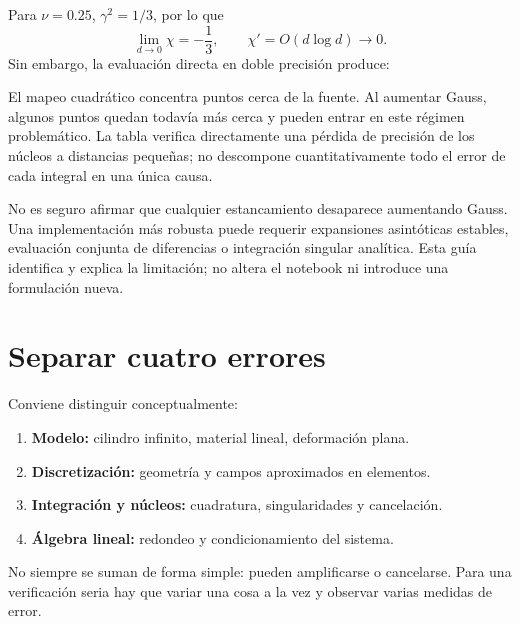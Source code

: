 \documentclass[11pt,a4paper]{report}
\numberwithin{equation}{chapter}
\begin{document}
Para $\nu=0.25$, $\gamma^2=1/3$, por lo que
\begin{equation}
 \lim_{d\to0}\chi=-\frac13,\qquad
 \chi'=O(d\log d)\longrightarrow0.
\end{equation}
Sin embargo, la evaluaci\'on directa en doble precisi\'on produce:

\begin{table}[htbp]
\centering

\caption{Diagn\'ostico de peque\~na distancia a 30 rad/s con el material
del notebook. Los valores extremos de $\chi'$ y la p\'erdida de
$\chi\to-1/3$ evidencian cancelaci\'on y redondeo.}
\label{tab:cancelacion}
\end{table}

El mapeo cuadr\'atico concentra puntos cerca de la fuente.
Al aumentar Gauss, algunos puntos quedan todav\'ia m\'as cerca y
pueden entrar en este r\'egimen problem\'atico.
La tabla verifica directamente una p\'erdida de precisi\'on de los
n\'ucleos a distancias peque\~nas; no descompone cuantitativamente
todo el error de cada integral en una \'unica causa.

\begin{cuidado}
No es seguro afirmar que cualquier estancamiento desaparece aumentando
Gauss. Una implementaci\'on m\'as robusta puede requerir expansiones
asint\'oticas estables, evaluaci\'on conjunta de diferencias o integraci\'on
singular anal\'itica. Esta gu\'ia identifica y explica la limitaci\'on;
no altera el notebook ni introduce una formulaci\'on nueva.
\end{cuidado}

\section{Separar cuatro errores}
Conviene distinguir conceptualmente:
\begin{enumerate}
 \item \textbf{Modelo:} cilindro infinito, material lineal, deformaci\'on plana.
 \item \textbf{Discretizaci\'on:} geometr\'ia y campos aproximados en elementos.
 \item \textbf{Integraci\'on y n\'ucleos:} cuadratura, singularidades y cancelaci\'on.
 \item \textbf{\'Algebra lineal:} redondeo y condicionamiento del sistema.
\end{enumerate}
No siempre se suman de forma simple: pueden amplificarse o cancelarse.
Para una verificaci\'on seria hay que variar una cosa a la vez y
observar varias medidas de error.
\end{document}
